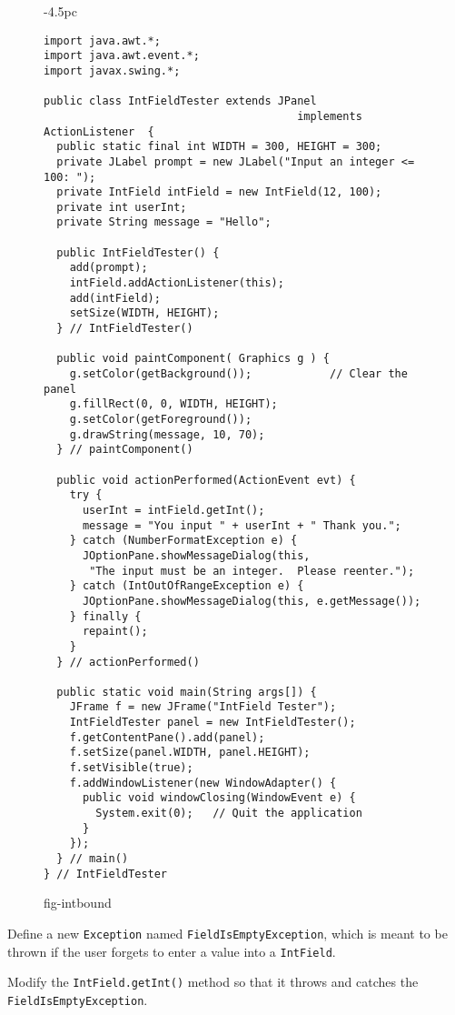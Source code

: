 \begin{figure}[p]
\jjjprogstart
\begin{jjjlistingleft}[30.5pc]{-4.5pc}
\begin{lstlisting}
import java.awt.*;
import java.awt.event.*;
import javax.swing.*;

public class IntFieldTester extends JPanel 
                                       implements ActionListener  {
  public static final int WIDTH = 300, HEIGHT = 300;
  private JLabel prompt = new JLabel("Input an integer <= 100: ");
  private IntField intField = new IntField(12, 100);
  private int userInt;
  private String message = "Hello";

  public IntFieldTester() {
    add(prompt);
    intField.addActionListener(this);
    add(intField);
    setSize(WIDTH, HEIGHT);
  } // IntFieldTester()

  public void paintComponent( Graphics g ) {
    g.setColor(getBackground());            // Clear the panel
    g.fillRect(0, 0, WIDTH, HEIGHT);
    g.setColor(getForeground());
    g.drawString(message, 10, 70);
  } // paintComponent()

  public void actionPerformed(ActionEvent evt) {
    try {
      userInt = intField.getInt();
      message = "You input " + userInt + " Thank you.";
    } catch (NumberFormatException e) {
      JOptionPane.showMessageDialog(this,
       "The input must be an integer.  Please reenter.");
    } catch (IntOutOfRangeException e) {
      JOptionPane.showMessageDialog(this, e.getMessage());
    } finally {
      repaint();
    }
  } // actionPerformed()

  public static void main(String args[]) {
    JFrame f = new JFrame("IntField Tester");
    IntFieldTester panel = new IntFieldTester();
    f.getContentPane().add(panel);
    f.setSize(panel.WIDTH, panel.HEIGHT);
    f.setVisible(true);
    f.addWindowListener(new WindowAdapter() { 
      public void windowClosing(WindowEvent e) {
        System.exit(0);   // Quit the application
      }
    });
  } // main()
} // IntFieldTester
\end{lstlisting}
\end{jjjlistingleft}
{fig-intbound}
\end{figure}

\label{self-study-exercises}
\begin{SSTUDY}

\item  Define a new {\tt Exception} named {\tt FieldIsEmpty\-Exception},
which is meant to be thrown if the user forgets to enter
a value into a {\tt IntField}.


\item  Modify the {\tt IntField.getInt()} method so that it throws and catches
the {\tt FieldIsEmptyException}.

\end{SSTUDY}

